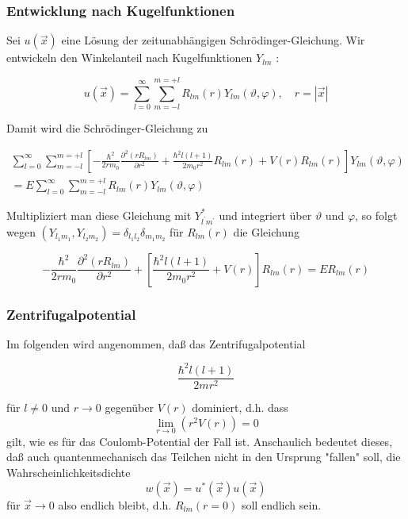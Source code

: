 \documentclass[10pt, letterpaper]{article}
\begin{document}
\subsubsection*{Entwicklung nach Kugelfunktionen}
Sei $u(\vec{x})$ eine Lösung der zeitunabhängigen Schrödinger-Gleichung. Wir entwickeln den Winkelanteil nach Kugelfunktionen $Y_{l m}$ :

$$
u(\vec{x})=\sum_{l=0}^{\infty} \sum_{m=-l}^{m=+l} R_{l m}(r) Y_{l m}(\vartheta, \varphi), \quad r=|\vec{x}|
$$

Damit wird die Schrödinger-Gleichung zu

$$
\begin{array}{r}
\sum_{l=0}^{\infty} \sum_{m=-l}^{m=+l}\left[-\frac{\hbar^{2}}{2 r m_{0}} \frac{\partial^{2}\left(r R_{l m}\right)}{\partial r^{2}}+\frac{\hbar^{2} l(l+1)}{2 m_{0} r^{2}} R_{l m}(r)+V(r) R_{l m}(r)\right] Y_{l m}(\vartheta, \varphi) \\
=E \sum_{l=0}^{\infty} \sum_{m=-l}^{m=+l} R_{l m}(r) Y_{l m}(\vartheta, \varphi)
\end{array}
$$

Multipliziert man diese Gleichung mit $Y_{l^{\prime} m^{\prime}}^{*}$ und integriert über $\vartheta$ und $\varphi$, so folgt wegen $\left(Y_{l_{1} m_{1}}, Y_{l_{2} m_{2}}\right)=\delta_{l_{1} l_{2}} \delta_{m_{1} m_{2}}$ für $R_{l m}(r)$ die Gleichung

$$
-\frac{\hbar^{2}}{2 r m_{0}} \frac{\partial^{2}\left(r R_{l m}\right)}{\partial r^{2}}+\left[\frac{\hbar^{2} l(l+1)}{2 m_{0} r^{2}}+V(r)\right] R_{l m}(r)=E R_{l m}(r)
$$

\subsubsection*{Zentrifugalpotential}
Im folgenden wird angenommen, daß das Zentrifugalpotential

$$
\frac{\hbar^{2} l(l+1)}{2 m r^{2}}
$$

für $l \neq 0$ und $r \rightarrow 0$ gegenüber $V(r)$ dominiert, d.h. dass
$$
\lim _{r \rightarrow 0}\left(r^{2} V(r)\right)=0
$$
gilt, wie es für das Coulomb-Potential der Fall ist. Anschaulich bedeutet dieses, daß auch quantenmechanisch das Teilchen nicht in den Ursprung "fallen" soll, die Wahrscheinlichkeitsdichte
$$
w(\vec{x})=u^{*}(\vec{x}) u(\vec{x})
$$
für $\vec{x} \rightarrow 0$ also endlich bleibt, d.h. $R_{l m}(r=0)$ soll endlich sein.
\end{document}
